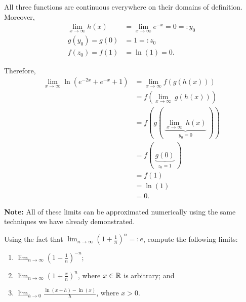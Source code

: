 \begin{enumerate}
All three functions are continuous everywhere on their domains of definition. Moreover, 
\begin{align*}
\lim_{x \to \infty} h(x) & =  \lim_{x \to \infty} e^{-x} = 0 =: y_0 \\
 g(y_0) = g(0) & = 1=: z_0 \\
 f(z_0) = f(1) & = \ln(1) = 0.
\end{align*}

Therefore, 
\begin{align*}
    \lim_{x \to \infty} \ln(e^{-2x} + e^{-x} + 1) & = \lim_{x \to \infty} f(g(h(x)))\\
    & = f ( \lim_{x \to \infty}~ g(h(x)) )\\
     & = f (g ( ~\underbrace{\lim_{x \to \infty}~ h(x)}_{y_0 = 0} ~) )\\
    & =  f ( ~\underbrace{g \left( 0 \right)}_{z_0 = 1} ~) \\
    & = f(1) \\
    & = \ln(1) \\
    & = 0.
\end{align*}
\end{enumerate}

\textbf{Note:} All of these limits can be approximated numerically using the same techniques we have already demonstrated.

\Qed

\bigskip
{}

\bigskip


\begin{example} 
\label{ex:eToPowerxDerivativeNatLogx}

Using the fact that $\displaystyle \lim_{n \to \infty} \left( 1 + \frac{1}{n} \right)^n =: e$, compute the following limits:
\begin{enumerate}
\renewcommand{\labelenumi}{(\alph{enumi})}
\setlength{\itemsep}{.2cm}

\item $\displaystyle \lim_{n \to \infty} \left( 1 - \frac{1}{n} \right)^{-n}$;

\item $\displaystyle \lim_{n \to \infty} \left( 1 + \frac{x}{n} \right)^n$, where $x \in \mathbb R$ is arbitrary; and

\item $\displaystyle \lim_{h \to 0} \frac{\ln(x + h) - \ln(x)}{h} $, where $x >0$.

\end{enumerate}    

\end{example}


